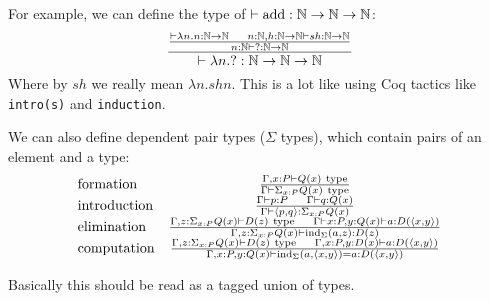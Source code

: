 \noindent For example, we can define the type of $\vdash \mathrm{add} : \mathbb{N} \to \mathbb{N} \to \mathbb{N}$:
\begin{alignat*}{2}
\frac{\frac{\vdash \lambda n. n : \mathbb{N} \to \mathbb{N}~~~~n: \mathbb{N}, h : \mathbb{N} \to \mathbb{N} \vdash sh : \mathbb{N} \to \mathbb{N}}
{n: \mathbb{N} \vdash ? : \mathbb{N} \to \mathbb{N}}}{\vdash \lambda n. ? : \mathbb{N} \to \mathbb{N} \to \mathbb{N}}
\end{alignat*}
Where by $sh$ we really mean $\lambda n. shn$. This is a lot like using Coq tactics
like \lstinline{intro(s)} and \lstinline{induction}. 

We can also define dependent pair types ($\Sigma$ types), which contain pairs of an element
and a type:
\[
\begin{array}{lc}
\text{formation} & \frac{\Gamma, x : P \vdash Q(x) ~\mathrm{type}}{\Gamma \vdash \Sigma_{x: P} Q(x) ~\mathrm{type}} \\
\text{introduction} & \frac{\Gamma \vdash p : P~~~~\Gamma \vdash q: Q(x)}{\Gamma \vdash \langle p, q \rangle : \Sigma_{x : P} Q(x)} \\

\text{elimination} & \frac{\Gamma, z : \Sigma_{x: P} Q(x) \vdash D(z) ~\mathrm{type}~~~~
\Gamma \vdash x: P, y : Q(x)\vdash
a : D(\langle x, y \rangle)}
{\Gamma, z : \Sigma_{x : P} Q(x) \vdash \mathrm{ind}_\Sigma (a, z) : D(z)} \\

\text{computation} & \frac{\Gamma, z : \Sigma_{x: P} Q(x) \vdash D(z) ~\mathrm{type}~~~~
\Gamma, x : P, y : D(x) \vdash a : D(\langle x, y \rangle)}
{\Gamma, x : P, y : Q(x) \vdash \mathrm{ind}_\Sigma (a, \langle x, y \rangle) = a : D(\langle x, y\rangle)}
\end{array}
\]

Basically this should be read as a tagged union of types.

